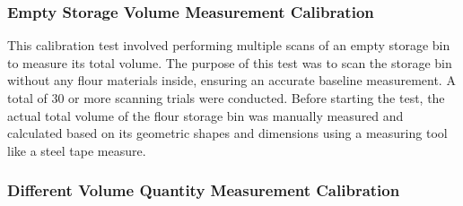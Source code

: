 \subsubsection{Empty Storage Volume Measurement Calibration}
\label{ch3:subsubsec:empty-storage-volume-measurement-calibration}
This calibration test involved performing multiple scans of an empty storage bin to measure its total volume. The purpose of this test was to scan the storage bin without any flour materials inside, ensuring an accurate baseline measurement. A total of 30 or more scanning trials were conducted. Before starting the test, the actual total volume of the flour storage bin was manually measured and calculated based on its geometric shapes and dimensions using a measuring tool like a steel tape measure.






\subsubsection{Different Volume Quantity Measurement Calibration}
\label{ch3:subsubsec:different-volume-measurement-test}

